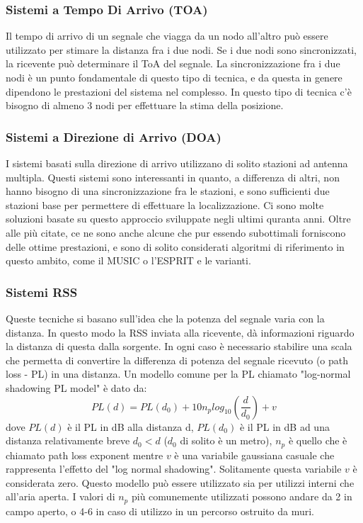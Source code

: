 \subsubsection{Sistemi a Tempo Di Arrivo (TOA)}

Il tempo di arrivo di un segnale che viagga da un nodo all'altro può essere utilizzato per stimare la distanza fra i due nodi. Se i due nodi sono sincronizzati, la ricevente può determinare il ToA del segnale. La sincronizzazione fra i due nodi è un punto fondamentale di questo tipo di tecnica, e da questa in genere dipendono le prestazioni del sistema nel complesso. In questo tipo di tecnica c'è bisogno di almeno 3 nodi per effettuare la stima della posizione.

\subsubsection{Sistemi a Direzione di Arrivo (DOA)}

I sistemi basati sulla direzione di arrivo utilizzano di solito stazioni ad antenna multipla. Questi sistemi sono interessanti in quanto, a differenza di altri, non hanno bisogno di una sincronizzazione fra le stazioni, e sono sufficienti due stazioni base per permettere	di effettuare la localizzazione. Ci sono molte soluzioni basate su questo approccio sviluppate negli ultimi quranta anni. Oltre alle più citate, ce ne sono anche alcune che pur essendo subottimali forniscono delle ottime prestazioni, e sono di solito considerati algoritmi di riferimento in questo ambito, come il MUSIC o l'ESPRIT e le varianti.

\subsubsection{Sistemi RSS}
Queste tecniche si basano sull'idea che la potenza del segnale varia con la distanza. In questo modo la RSS inviata alla ricevente, dà informazioni riguardo la distanza di questa dalla sorgente. In ogni caso è necessario stabilire una scala che permetta di convertire la differenza di potenza del segnale ricevuto (o path loss - PL) in una distanza. Un modello comune per la PL chiamato "log-normal shadowing PL model" è dato da:
 $$ PL\left(d\right) = PL\left(d_0\right) + 10n_plog_{10} \left( \frac{d}{d_0} \right) + v $$
dove $ PL(d) $ è il PL in dB alla distanza d, $ PL(d_0) $ è il PL in dB ad una distanza relativamente breve $ d_0 < d $ ($ d_{0} $ di solito è un metro), $n_p$ è quello che è chiamato path loss exponent mentre $v$ è una variabile gaussiana casuale che rappresenta l'effetto del "log normal shadowing". Solitamente questa variabile $v$ è considerata zero. Questo modello può essere utilizzato sia per utilizzi interni che all'aria aperta. I valori di $n_p$ più comunemente utilizzati possono andare da 2 in campo aperto, o 4-6 in caso di utilizzo in un percorso ostruito da muri.

